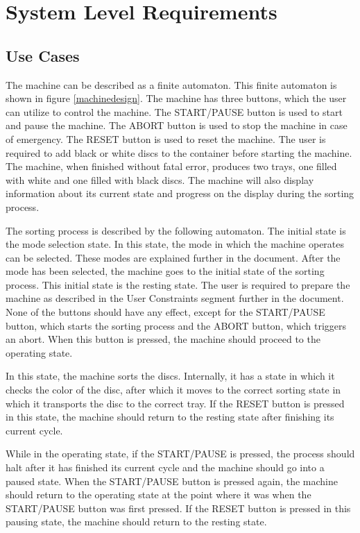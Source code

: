 \documentclass[a4paper,oneside,11pt]{article}
\begin{document}
\section{System Level Requirements}
\subsection{Use Cases}
The machine can be described as a finite automaton. This finite automaton is shown in figure \ref{machinedesign}. The machine has three buttons, which the user can utilize to control the machine. The
START/PAUSE button is used to start and pause the machine. The ABORT button is used to
stop the machine in case of emergency. The RESET button is used to reset the machine. The
user is required to add black or white discs to the container before starting the machine.
The machine, when finished without fatal error, produces two trays, one filled with white
and one filled with black discs. The machine will also display information about its current
state and progress on the display during the sorting process.

The sorting process is described by the following automaton. The initial state is the mode selection state. In this state, the mode in which the machine operates can be selected. These modes are explained further in the document. After the mode has been selected, the machine goes to the initial state of the sorting process. This initial state is the resting state. The user is required to prepare the machine as described in the User Constraints segment further in the document. None of the buttons should have any effect, except for the START/PAUSE button, which starts the sorting process and the ABORT button, which triggers an abort. When this button is pressed, the machine should proceed to the operating state.

In this state, the machine sorts the discs. Internally, it has a state in which it checks the
color of the disc, after which it moves to the correct sorting state in which it transports the disc
to the correct tray. If the RESET button is pressed in this state, the machine should return to
the resting state after finishing its current cycle.

While in the operating state, if the START/PAUSE is pressed, the process should halt after it has finished its current cycle 
and the machine should go into a paused state. When the START/PAUSE button is pressed
again, the machine should return to the operating state at the point where it was when the
START/PAUSE button was first pressed. If the RESET button is pressed in this pausing state,
the machine should return to the resting state.
\end{document}
